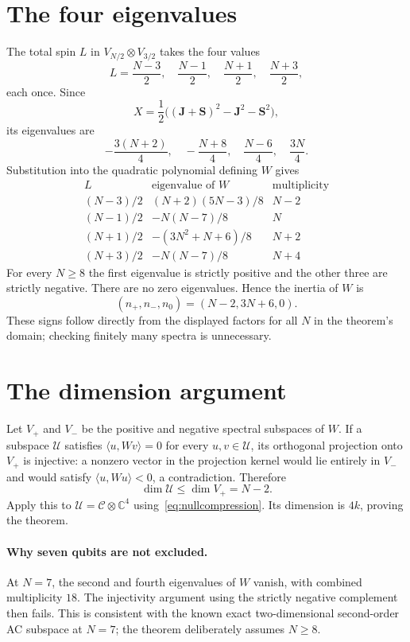 \documentclass[11pt]{article}
\begin{document}
\section{The four eigenvalues}
The total spin $L$ in $V_{N/2}\otimes V_{3/2}$ takes the four values
\[
L=\frac{N-3}{2},\quad\frac{N-1}{2},\quad\frac{N+1}{2},\quad\frac{N+3}{2},
\]
each once. Since
\[
X=\frac12\bigl((\mathbf J+\mathbf S)^2-\mathbf J^2-\mathbf S^2\bigr),
\]
its eigenvalues are
\[
-\frac{3(N+2)}4,\quad-\frac{N+8}4,\quad\frac{N-6}4,\quad\frac{3N}4.
\]
Substitution into the quadratic polynomial defining $W$ gives
\[
\begin{array}{c|c|c}
L&\text{eigenvalue of }W&\text{multiplicity}\\\hline
(N-3)/2&(N+2)(5N-3)/8&N-2\\
(N-1)/2&-N(N-7)/8&N\\
(N+1)/2&-(3N^2+N+6)/8&N+2\\
(N+3)/2&-N(N-7)/8&N+4
\end{array}
\]
For every $N\ge8$ the first eigenvalue is strictly positive and the other three are strictly negative. There are no zero eigenvalues. Hence the inertia of $W$ is
\[
(n_+,n_-,n_0)=(N-2,3N+6,0).
\]
These signs follow directly from the displayed factors for all $N$ in the theorem's domain; checking finitely many spectra is unnecessary.

\section{The dimension argument}
Let $V_+$ and $V_-$ be the positive and negative spectral subspaces of $W$. If a subspace $\mathcal U$ satisfies $\langle u,Wv\rangle=0$ for every $u,v\in\mathcal U$, its orthogonal projection onto $V_+$ is injective: a nonzero vector in the projection kernel would lie entirely in $V_-$ and would satisfy $\langle u,Wu\rangle<0$, a contradiction. Therefore
\[
\dim\mathcal U\le\dim V_+=N-2.
\]
Apply this to $\mathcal U=\mathcal C\otimes\mathbb C^4$ using~\eqref{eq:nullcompression}. Its dimension is $4k$, proving the theorem.

\paragraph{Why seven qubits are not excluded.}
At $N=7$, the second and fourth eigenvalues of $W$ vanish, with combined multiplicity $18$. The injectivity argument using the strictly negative complement then fails. This is consistent with the known exact two-dimensional second-order AC subspace at $N=7$; the theorem deliberately assumes $N\ge8$.
\end{document}

